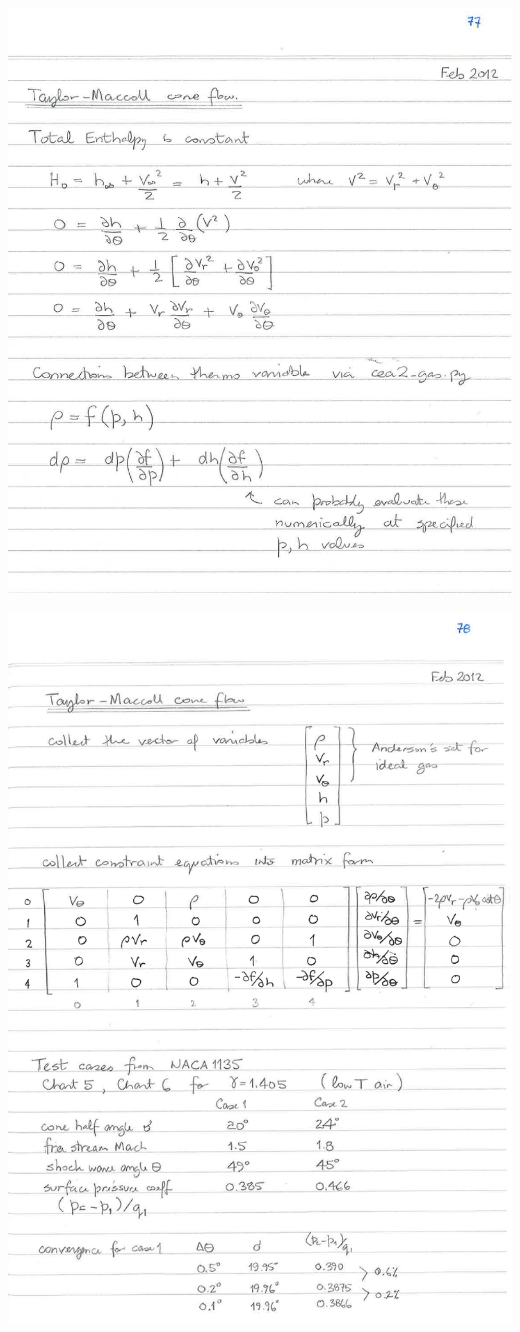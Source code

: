 \documentclass[landscape,12pt,a4paper]{article}
\begin{document}
\newpage
\begin{center}
\includegraphics[width=\textheight,angle=90]{../figs/pj-workbook-page-77.png}
\end{center}

\newpage
\begin{center}
\includegraphics[width=\textheight,angle=90]{../figs/pj-workbook-page-78.png}
\end{center}
\end{document}

